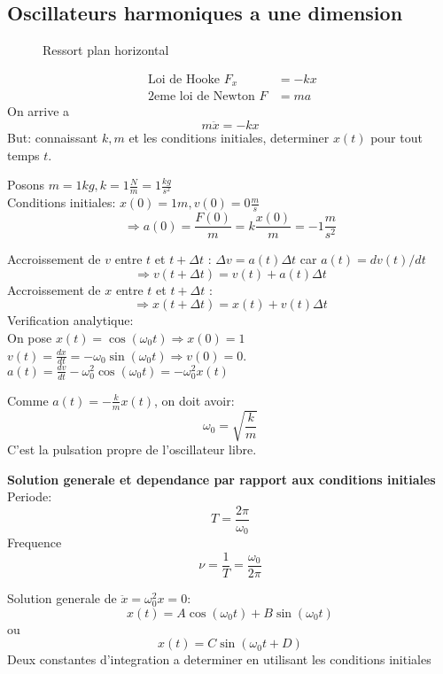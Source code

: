 \documentclass[../main.tex]{subfiles}
\begin{document}
\subsection{Oscillateurs harmoniques a une dimension}
\begin{figure}[ht]
    \centering
    \caption{Ressort plan horizontal}
    \label{fig:ressort-plan-horizontal}
\end{figure}
\begin{align*}
	\text{ Loi de Hooke } F_x &= -kx\\
	\text{ 2eme loi de Newton } F &=ma
\end{align*}
On arrive a 
\[ 
	m\ddot{x}= -kx
\]
But: connaissant $k,m$ et les conditions initiales, determiner $x(t)$ pour tout temps $t$.
\begin{exemple}
Posons $m=1kg, k=1 \frac{N}{m}=1 \frac{kg}{s^{2}}$\\
Conditions initiales: $x(0)=1m, v(0)=0 \frac{m}{s}$ 
\[ 
	\Rightarrow a(0) = \frac{F(0)}{m} = k \frac{x(0)}{m} = -1 \frac{m}{s^{2}}
\]

Accroissement de $v$ entre $t$ et $t+\Delta t$ :
$\Delta v = a(t) \Delta t$ car $a(t)=dv(t) / dt$ \\
\[ 
	\Rightarrow v(t+\Delta t)= v(t)+a(t) \Delta t
\]
Accroissement de $x$ entre $t$ et $t+\Delta t$ :
\[ 
	\Rightarrow x(t+\Delta t)=x(t) +v(t) \Delta t
\]
Verification analytique:\\
On pose $x(t)= \cos(\omega_0 t) \Rightarrow x(0)=1$\\
$v(t)= \frac{dx}{dt}=-\omega_0\sin(\omega_0 t) \Rightarrow  v(0)=0$.\\
$a(t)= \frac{dv}{dt} - \omega_0^{2} \cos(\omega_0 t) = - \omega_0^{2}x(t)$

Comme $a(t)=-\frac{k}{m}x(t)$, on doit avoir:
\[ 
	\omega_0= \sqrt{\frac{k}{m}}
\]
C'est la pulsation propre de l'oscillateur libre.

\textbf{Solution generale et dependance par rapport aux conditions initiales}\\

Periode:
\[ 
T = \frac{2\pi}{\omega_0}
\]
Frequence
\[ 
\nu = \frac{1}{T} = \frac{\omega_0}{2\pi}
\]

\end{exemple}
Solution generale de $\ddot{x}= \omega_0^{2}x =0$:
\[ 
	x(t) = A\cos(\omega_0 t) + B \sin(\omega_0t )
\]
ou 
\[ 
	x(t) = C \sin(\omega_0t + D)
\]
Deux constantes d'integration a determiner en utilisant les conditions initiales
\end{document}
